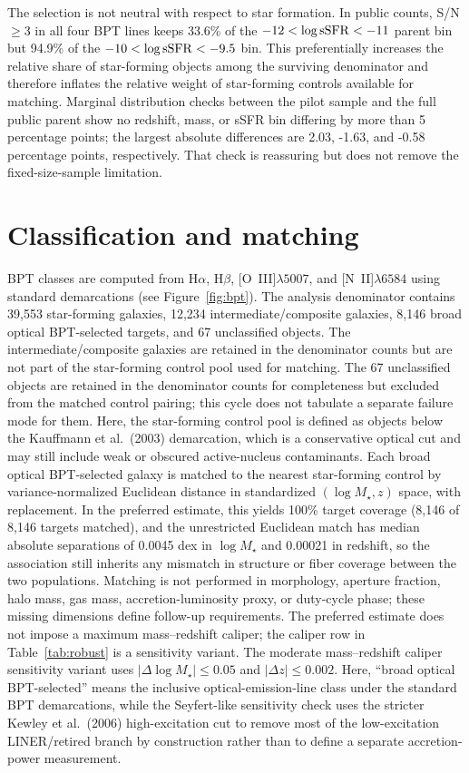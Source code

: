\documentclass[twocolumn]{aastex631}
\begin{document}
The selection is not neutral with respect to star formation. In public counts, S/N$\geq3$ in all four BPT lines keeps 33.6\% of the $-12<\log {\rm sSFR}<-11$ parent bin but 94.9\% of the $-10<\log {\rm sSFR}<-9.5$ bin. This preferentially increases the relative share of star-forming objects among the surviving denominator and therefore inflates the relative weight of star-forming controls available for matching. Marginal distribution checks between the pilot sample and the full public parent show no redshift, mass, or sSFR bin differing by more than 5 percentage points; the largest absolute differences are 2.03, -1.63, and -0.58 percentage points, respectively. That check is reassuring but does not remove the fixed-size-sample limitation.

\section{Classification and matching}
BPT classes are computed from H$\alpha$, H$\beta$, [O~III]$\lambda5007$, and [N~II]$\lambda6584$ using standard demarcations \citep{baldwin1981,kewley2001,kauffmann2003bpt,kewley2006} (see Figure~\ref{fig:bpt}). The analysis denominator contains 39,553 star-forming galaxies, 12,234 intermediate/composite galaxies, 8,146 broad optical BPT-selected targets, and 67 unclassified objects. The intermediate/composite galaxies are retained in the denominator counts but are not part of the star-forming control pool used for matching. The 67 unclassified objects are retained in the denominator counts for completeness but excluded from the matched control pairing; this cycle does not tabulate a separate failure mode for them. Here, the star-forming control pool is defined as objects below the Kauffmann et al.\ (2003) demarcation, which is a conservative optical cut and may still include weak or obscured active-nucleus contaminants. Each broad optical BPT-selected galaxy is matched to the nearest star-forming control by variance-normalized Euclidean distance in standardized $(\log M_\star,z)$ space, with replacement. In the preferred estimate, this yields 100\% target coverage (8,146 of 8,146 targets matched), and the unrestricted Euclidean match has median absolute separations of 0.0045 dex in $\log M_\star$ and 0.00021 in redshift, so the association still inherits any mismatch in structure or fiber coverage between the two populations. Matching is not performed in morphology, aperture fraction, halo mass, gas mass, accretion-luminosity proxy, or duty-cycle phase; these missing dimensions define follow-up requirements. The preferred estimate does not impose a maximum mass--redshift caliper; the caliper row in Table~\ref{tab:robust} is a sensitivity variant. The moderate mass--redshift caliper sensitivity variant uses $|\Delta\log M_\star|\leq0.05$ and $|\Delta z|\leq0.002$.
Here, ``broad optical BPT-selected'' means the inclusive optical-emission-line class under the standard BPT demarcations, while the Seyfert-like sensitivity check uses the stricter Kewley et al.\ (2006) high-excitation cut to remove most of the low-excitation LINER/retired branch by construction rather than to define a separate accretion-power measurement.
\end{document}
